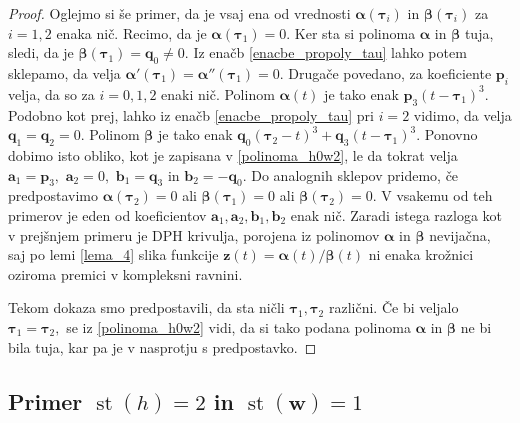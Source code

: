 \documentclass[12pt,a4paper,twoside]{article}
\theoremstyle{definition} %
\theoremstyle{plain} %
\theoremstyle{primerstyle}
\numberwithin{equation}{section}  %
\newcommand{\aV}{\mathbf{a}}
\newcommand{\bV}{\mathbf{b}}
\newcommand{\pV}{\mathbf{p}}
\newcommand{\qV}{\mathbf{q}}
\newcommand{\wV}{\mathbf{w}}
\newcommand{\zV}{\mathbf{z}}
\newcommand{\balpha}{\boldsymbol \alpha}
\newcommand{\bbeta}{\boldsymbol \beta}
\newcommand{\btau}{\boldsymbol \tau}
\DeclareMathOperator{\st}{st}
\begin{document}
\begin{proof}
	Oglejmo si še primer, da je vsaj ena od vrednosti $\balpha(\btau_i)$ in $\bbeta(\btau_i)$ za $i=1,2$ enaka nič. Recimo, da je $\balpha(\btau_1)=0.$ Ker sta si polinoma $\balpha$ in $\bbeta$ tuja, sledi, da je $\bbeta(\btau_1)=\qV_0\neq0.$ Iz enačb \eqref{enacbe_propoly_tau} lahko potem sklepamo, da velja $\balpha'(\btau_1)=\balpha''(\btau_1)=0.$ Drugače povedano, za koeficiente $\pV_i$ velja, da so za $i=0,1,2$ enaki nič. Polinom $\balpha(t)$ je tako enak $\pV_3(t-\btau_1)^3.$ Podobno kot prej, lahko iz enačb \eqref{enacbe_propoly_tau} pri $i=2$ vidimo, da velja $\qV_1=\qV_2=0.$ Polinom $\bbeta$ je tako enak $\qV_0(\btau_2-t)^3+\qV_3(t-\btau_1)^3.$ Ponovno dobimo isto obliko, kot je zapisana v \eqref{polinoma_h0w2}, le da tokrat velja $\aV_1=\pV_3,$ $\aV_2=0,$ $\bV_1=\qV_3$ in $\bV_2=-\qV_0.$ Do analognih sklepov pridemo, če predpostavimo $\balpha(\btau_2)=0$ ali $\bbeta(\btau_1)=0$ ali $\bbeta(\btau_2)=0.$ V vsakemu od teh primerov je eden od koeficientov $\aV_1,\aV_2,\bV_1,\bV_2$ enak nič. Zaradi istega razloga kot v prejšnjem primeru je DPH krivulja, porojena iz polinomov $\balpha$ in $\bbeta$ nevijačna, saj po lemi \ref{lema_4} slika funkcije $\zV(t)=\balpha(t)/\bbeta(t)$ ni enaka krožnici oziroma premici v kompleksni ravnini.
	
	Tekom dokaza smo predpostavili, da sta ničli $\btau_1,\btau_2$ različni. Če bi veljalo $\btau_1=\btau_2,$ se iz \eqref{polinoma_h0w2} vidi, da si tako podana polinoma $\balpha$ in $\bbeta$ ne bi bila tuja, kar pa je v nasprotju s predpostavko.
\end{proof}

\subsection{Primer \texorpdfstring{$\st(h)=2$}{st(h)=2} in \texorpdfstring{$\st(\wV)=1$}{st(w)=1}}
\label{locevanje_h2w1}
\end{document}
